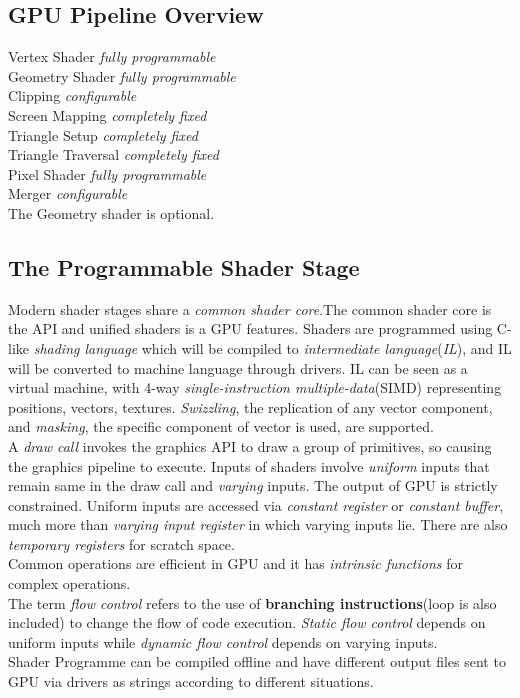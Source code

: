 \documentclass[10pt, a4paper]{article}
\begin{document}
        \subsection{GPU Pipeline Overview}
            \noindent Vertex Shader \hfill\emph{fully programmable}\\
            Geometry Shader \hfill\emph{fully programmable}\\
            Clipping \hfill\emph{configurable}\\
            Screen Mapping \hfill\emph{completely fixed}\\
            Triangle Setup \hfill\emph{completely fixed}\\
            Triangle Traversal \hfill\emph{completely fixed}\\
            Pixel Shader \hfill\emph{fully programmable}\\
            Merger \hfill\emph{configurable}\\
            
            The Geometry shader is optional.

        \subsection{The Programmable Shader Stage}
            Modern shader stages share a \emph{common shader core}.The common shader core is the API and unified shaders is a GPU features. Shaders are programmed using C-like \emph{shading language} which will be compiled to \emph{intermediate language}(\emph{IL}), and IL will be converted to machine language through drivers. IL can be seen as a virtual machine, with 4-way \emph{single-instruction multiple-data}(SIMD) representing positions, vectors, textures. \emph{Swizzling}, the replication of any vector component, and \emph{masking}, the specific component of vector is used, are supported. \\
            \indent A \emph{draw call} invokes the graphics API to draw a group of primitives, so causing the graphics pipeline to execute. Inputs of shaders involve \emph{uniform} inputs that remain same in the draw call and \emph{varying} inputs. The output of GPU is strictly constrained. Uniform inputs are accessed via \emph{constant register} or \emph{constant buffer}, much more than \emph{varying input register} in which varying inputs lie. There are also \emph{temporary registers} for scratch space.\\
            \indent Common operations are efficient in GPU and it has \emph{intrinsic functions} for complex operations.\\
            \indent The term \emph{flow control} refers to the use of \textbf{branching instructions}(loop is also included) to change the flow of code execution. \emph{Static flow control} depends on uniform inputs while \emph{dynamic flow control} depends on varying inputs.\\
            Shader Programme can be compiled offline and have different output files sent to GPU via drivers as strings according to different situations.
        
\end{document}

